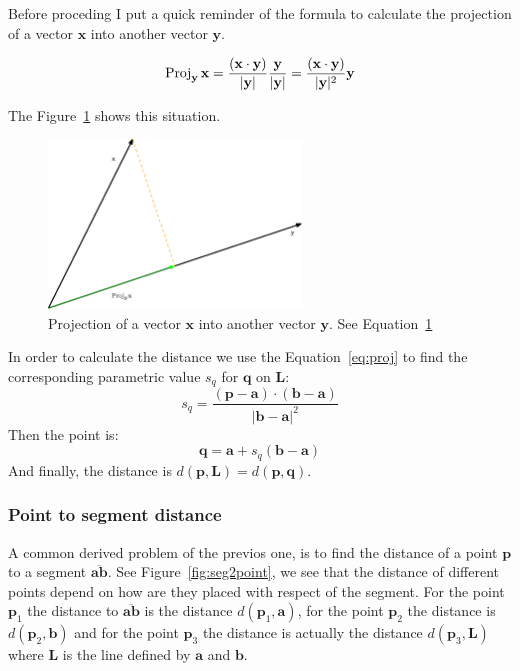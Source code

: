 Before proceding I put a quick reminder of the formula to calculate the projection of a vector $\mathbf{x}$ into another vector $\mathbf{y}$. 

\begin{equation}
\operatorname{Proj}_{\mathbf{y}}\mathbf{x} = \dfrac{(\mathbf{x} \cdot \mathbf{y})}{|\mathbf{y}|} \dfrac{\mathbf{y}}{|\mathbf{y}|} = \dfrac{(\mathbf{x} \cdot \mathbf{y})}{|\mathbf{y}|^2}\mathbf{y}
\label{eq:proj}
\end{equation}

The Figure~\ref{fig:projection} shows this situation.

\begin{figure}[htb]
  \centering
  \includegraphics[width=0.60\textwidth]{img/projection}
  \caption{Projection of a vector $\mathbf{x}$ into another vector $\mathbf{y}$. See Equation~\ref{fig:projection}}
  \label{fig:projection}
\end{figure}

In order to calculate the distance we use the Equation~\ref{eq:proj} to find the corresponding parametric value $s_q$ for $\mathbf{q}$ on $\mathbf{L}$: 
\begin{equation}
s_q = \dfrac{(\mathbf{p} - \mathbf{a}) \cdot (\mathbf{b} - \mathbf{a})}{|\mathbf{b} - \mathbf{a}|^2}
\label{eq:scalarq}
\end{equation}
Then the point is:
\begin{equation}
\mathbf{q} = \mathbf{a} + s_q (\mathbf{b} -\mathbf{a})
\label{eq:pointq}
\end{equation}
And finally, the distance is $d(\mathbf{p}, \mathbf{L}) = d(\mathbf{p}, \mathbf{q})$.

\subsubsection{Point to segment distance}

A common derived problem of the previos one, is to find the distance of a point $\mathbf{p}$ to a segment $\overline{\mathbf{a}\mathbf{b}}$.
See Figure~\ref{fig:seg2point}, we see that the distance of different points depend on how are they placed with respect of the segment.
For the point $\mathbf{p}_1$ the distance to $\overline{\mathbf{a}\mathbf{b}}$ is the distance $d(\mathbf{p}_1, \mathbf{a})$, for the point $\mathbf{p}_2$ the distance is $d(\mathbf{p}_2, \mathbf{b})$ and for the point $\mathbf{p}_3$ the distance is actually the distance $d(\mathbf{p}_3, \mathbf{L})$ where $\mathbf{L}$ is the line defined by $\mathbf{a}$ and $\mathbf{b}$.

